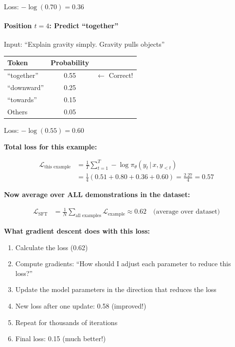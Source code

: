 \begin{chapterenv}
Loss: $-\log(0.70) = 0.36$

\paragraph{Position $t=4$: Predict ``together''}

Input: ``Explain gravity simply. Gravity pulls objects''

\begin{center}
\begin{tabular}{lcc}
\toprule
\textbf{Token} & \textbf{Probability} & \\
\midrule
``together'' & 0.55 & $\leftarrow$ Correct! \\
``downward'' & 0.25 & \\
``towards'' & 0.15 & \\
Others & 0.05 & \\
\bottomrule
\end{tabular}
\end{center}

Loss: $-\log(0.55) = 0.60$

\textbf{Total loss for this example:}

\begin{align*}
\mathcal{L}_{\text{this example}} &= \frac{1}{T}\sum_{t=1}^T -\log \pi_\theta(y_t \,|\, x, y_{<t}) \\
&= \frac{1}{4}(0.51 + 0.80 + 0.36 + 0.60) = \frac{2.27}{4} = 0.57
\end{align*}

\textbf{Now average over ALL demonstrations in the dataset:}

\begin{align*}
\mathcal{L}_{\text{SFT}} &= \frac{1}{N} \sum_{\text{all examples}} \mathcal{L}_{\text{example}} \approx 0.62 \quad \text{(average over dataset)}
\end{align*}

\begin{infobox}
\textbf{What gradient descent does with this loss:}

\begin{enumerate}[nosep]
    \item Calculate the loss (0.62)
    \item Compute gradients: ``How should I adjust each parameter to reduce this loss?''
    \item Update the model parameters in the direction that reduces the loss
    \item New loss after one update: 0.58 (improved!)
    \item Repeat for thousands of iterations
    \item Final loss: 0.15 (much better!)
\end{enumerate}


\end{infobox}
\end{chapterenv}
